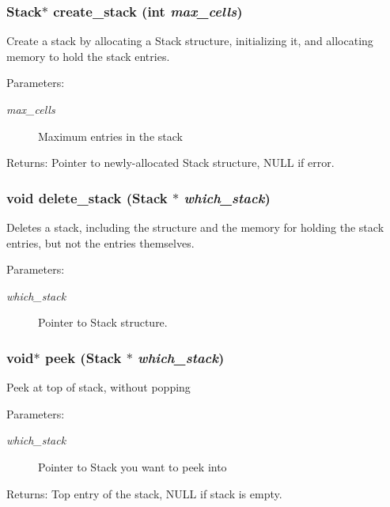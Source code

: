 \subsubsection{\setlength{\rightskip}{0pt plus 5cm}\bf{Stack}$\ast$ create\_\-stack (int {\em max\_\-cells})}\label{stack_8h_f3af8ef3ef58b09c15cca16fd5e09907}


Create a stack by allocating a Stack structure, initializing it, and allocating memory to hold the stack entries. \begin{Desc}
\item[Parameters:]
\begin{description}
\item[{\em max\_\-cells}]Maximum entries in the stack \end{description}
\end{Desc}
\begin{Desc}
\item[Returns:]Pointer to newly-allocated Stack structure, NULL if error. \end{Desc}
\subsubsection{\setlength{\rightskip}{0pt plus 5cm}void delete\_\-stack (\bf{Stack} $\ast$ {\em which\_\-stack})}\label{stack_8h_f3285173a95add78b1910a3267378ed6}


Deletes a stack, including the structure and the memory for holding the stack entries, but not the entries themselves. \begin{Desc}
\item[Parameters:]
\begin{description}
\item[{\em which\_\-stack}]Pointer to Stack structure. \end{description}
\end{Desc}
\subsubsection{\setlength{\rightskip}{0pt plus 5cm}void$\ast$ peek (\bf{Stack} $\ast$ {\em which\_\-stack})}\label{stack_8h_e6d178d94e76c529952cc01831026670}


Peek at top of stack, without popping \begin{Desc}
\item[Parameters:]
\begin{description}
\item[{\em which\_\-stack}]Pointer to Stack you want to peek into \end{description}
\end{Desc}
\begin{Desc}
\item[Returns:]Top entry of the stack, NULL if stack is empty. \end{Desc}
